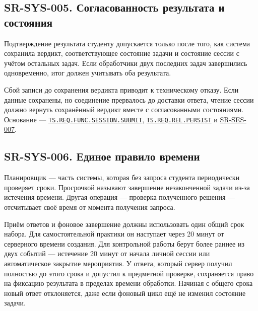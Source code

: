 \documentclass[12pt,a4paper]{article}
\begin{document}
\subsection{SR-SYS-005. Согласованность результата и состояния}\label{sr-sys-005-ux441ux43eux433ux43bux430ux441ux43eux432ux430ux43dux43dux43eux441ux442ux44c-ux440ux435ux437ux443ux43bux44cux442ux430ux442ux430-ux438-ux441ux43eux441ux442ux43eux44fux43dux438ux44f}

\hypertarget{sr-sys-005-согласованность-результата-и-состояния}{}

\hypertarget{sr-sys-005}{}

Подтверждение результата студенту допускается только после того, как система сохранила вердикт, соответствующее состояние задачи и состояние сессии с учётом остальных задач. Если обработчики двух последних задач завершились одновременно, итог должен учитывать оба результата.

Сбой записи до сохранения вердикта приводит к техническому отказу. Если данные сохранены, но соединение прервалось до доставки ответа, чтение сессии должно вернуть сохранённый вердикт вместе с согласованными состояниями. Основание --- {\href{../02\_Техническое\_задание/Техническое\_задание.pdf\#ts-req-func-session-submit}{\texttt{TS.\allowbreak{}REQ.\allowbreak{}FUNC.\allowbreak{}SESSION.\allowbreak{}SUBMIT}}}, {\href{../02\_Техническое\_задание/Техническое\_задание.pdf\#ts-req-rel-persist}{\texttt{TS.\allowbreak{}REQ.\allowbreak{}REL.\allowbreak{}PERSIST}}} и {\hyperlink{sr-ses-007}{SR-SES-007}}.

\subsection{SR-SYS-006. Единое правило времени}\label{sr-sys-006-ux435ux434ux438ux43dux43eux435-ux43fux440ux430ux432ux438ux43bux43e-ux432ux440ux435ux43cux435ux43dux438}

\hypertarget{sr-sys-006-единое-правило-времени}{}

\hypertarget{sr-sys-006}{}

Планировщик --- часть системы, которая без запроса студента периодически проверяет сроки. Просрочкой называют завершение незаконченной задачи из-за истечения времени. Другая операция --- проверка полученного решения --- отсчитывает своё время от момента получения запроса.

Приём ответов и фоновое завершение должны использовать один общий срок набора. Для самостоятельной практики он наступает через 20 минут от серверного времени создания. Для контрольной работы берут более раннее из двух событий --- истечение 20 минут от начала личной сессии или автоматическое закрытие мероприятия. У ответа, который сервер получил полностью до этого срока и допустил к предметной проверке, сохраняется право на фиксацию результата в пределах времени обработки. Начиная с общего срока новый ответ отклоняется, даже если фоновый цикл ещё не изменил состояние задачи.
\end{document}
